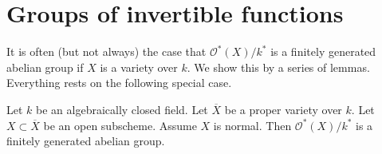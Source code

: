 \section{Groups of invertible functions}
\label{section-units}

\noindent
It is often (but not always) the case that $\mathcal{O}^*(X)/k^*$
is a finitely generated abelian group if $X$ is a variety over $k$.
We show this by a series of lemmas.
Everything rests on the following special case.

\begin{lemma}
\label{lemma-open-in-normal-proper}
Let $k$ be an algebraically closed field.
Let $\overline{X}$ be a proper variety over $k$.
Let $X \subset \overline{X}$ be an open subscheme.
Assume $X$ is normal.
Then $\mathcal{O}^*(X)/k^*$ is a finitely generated abelian group.
\end{lemma}

